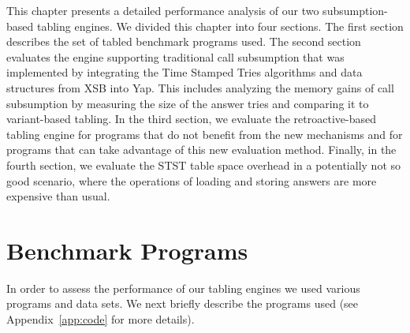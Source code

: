This chapter presents a detailed performance analysis of our two subsumption-based tabling engines.
We divided this chapter into four sections. The first section describes the
set of tabled benchmark programs used. The second
section evaluates the engine supporting traditional call subsumption that was implemented by integrating the
Time Stamped Tries algorithms and data structures from XSB into Yap. This includes analyzing the memory gains
of call subsumption by measuring the size of the answer tries and comparing it to variant-based tabling.
In the third section, we evaluate the retroactive-based tabling engine for programs that do not benefit
from the new mechanisms and for programs that can take advantage of this new evaluation method. Finally,
in the fourth section, we evaluate the STST table space overhead in a potentially not so good scenario,
where the operations of loading and storing answers are more expensive than usual.

\section{Benchmark Programs}

In order to assess the performance of our tabling engines we used various programs and data sets.
We next briefly describe the programs used (see Appendix~\ref{app:code} for more details).

